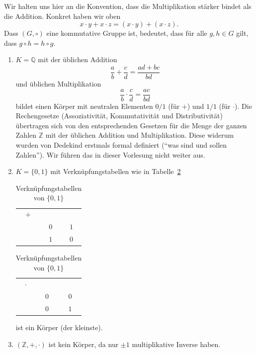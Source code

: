 \documentclass[../main.tex]{subfiles}
\begin{document}
Wir halten uns hier an die Konvention, dass die Multiplikation stärker
bindet als die Addition. Konkret haben wir oben
\[ x \cdot y + x \cdot z = (x \cdot y) + (x \cdot z).\]
Dass $(G, \circ)$ eine kommutative Gruppe ist, bedeutet,
dass für alle $g, h \in G$ gilt, dass $g \circ h = h \circ g$.

\begin{examples}
  \leavevmode
  \begin{enumerate}[(1)]
    \item $K = \mathbb Q$ mit der üblichen Addition
      \[ \frac{a}{b} + \frac{c}{d} = \frac{ad + bc}{bd}\]
      und üblichen Multiplikation
      \[ \frac{a}{b} \cdot \frac{c}{d} = \frac{ac}{bd}\]
      bildet einen Körper mit neutralen Elementen $0/1$ (für $+$) und $1/1$ (für $\cdot$).
      Die Rechengesetze (Assoziativität, Kommutativität und Distributivität) übertragen
      sich von den entsprechenden Gesetzen für die Menge der ganzen Zahlen $\mathbb Z$
      mit der üblichen Addition und Multiplikation.
      Diese widerum wurden von Dedekind erstmals formal definiert (``was
      sind und sollen Zahlen'').
      Wir
      führen das in dieser Vorlesung nicht weiter aus.
    \item $K = \{0, 1\}$ mit Verknüpfungstabellen
      wie in Tabelle~\ref{tab:01}
      \begin{table}[h]
        \centering
        \begin{minipage}{0.25\linewidth}
          \centering
        \begin{tabular}[h]{ccc}
         $+$ & \color{gray}{$0$} & \color{gray}{ $1$ }\\
        \color{gray}{$0$} & $0$ & $1$ \\
        \color{gray}{$1$} & $1$ & $0$
        \end{tabular}%
        \end{minipage}%
        \begin{minipage}{0.25\linewidth}
          \centering
        \begin{tabular}[h]{ccc}
          $\cdot$ & \color{gray}{$0$} & \color{gray}{$1$} \\
          \color{gray}{$0$} & $0$ & $0$ \\
          \color{gray}{$1$} & $0$ & $1$
        \end{tabular}
      \end{minipage}
      \caption{Verknüpfungstabellen von $\{0, 1\}$}%
      \label{tab:01}
      \end{table}
      ist ein Körper (der kleinste).
    \item $(\mathbb Z, + , \cdot)$ ist kein Körper, da nur $\pm 1$ multiplikative
      Inverse haben.
  \end{enumerate}
\end{examples}
\end{document}
